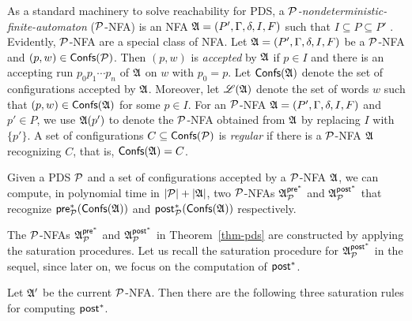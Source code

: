 
As a standard machinery to solve reachability for PDS, a \emph{${\mathcal{P} }$-nondeterministic-finite-automaton} (${\mathcal{P} }$-NFA) is an NFA ${\mathfrak{A} }=(P', \Gamma, \delta, I, F)$ such that $I \subseteq P \subseteq P'$ \cite{BEM97}.
Evidently, ${\mathcal{P} }$-NFA are a special class of NFA. 
Let ${\mathfrak{A} } = (P', \Gamma, \delta, I, F)$ be a  ${\mathcal{P} }$-NFA and  $(p, w) \in {\mathsf{Confs} }({\mathcal{P} })$. Then $(p, w)$ is \emph{accepted} by ${\mathfrak{A} }$ if $p \in I$ and there is an accepting run $p_0 p_1 \cdots p_n$ of ${\mathfrak{A} }$ on $w$ with $p_0 = p$. Let ${\mathsf{Confs} }({\mathfrak{A} })$ denote the set of configurations accepted by ${\mathfrak{A} }$. Moreover, let ${\mathscr{L} }({\mathfrak{A} })$ denote the set of words $w$ such that $(p, w) \in {\mathsf{Confs} }({\mathfrak{A} })$ for some $p \in I$. 
For an ${\mathcal{P} }$-NFA ${\mathfrak{A} } = (P', \Gamma, \delta, I, F)$ and $p' \in P$, we use ${\mathfrak{A} }(p')$ to denote the ${\mathcal{P} }$-NFA obtained from ${\mathfrak{A} }$ by replacing $I$ with $\{p'\}$. A set of configurations $C \subseteq {\mathsf{Confs} }({\mathcal{P} })$ is \emph{regular} if there is a ${\mathcal{P} }$-NFA ${\mathfrak{A} }$ recognizing $C$, that is, ${\mathsf{Confs} }({\mathfrak{A} }) = C$. %

\begin{theorem}\label{thm-pds}
	Given  a PDS ${\mathcal{P} }$ and a set of configurations accepted by a ${\mathcal{P} }$-NFA ${\mathfrak{A} }$, we can compute, in polynomial time in $|{\mathcal{P} }|+|{\mathfrak{A} }|$, two ${\mathcal{P} }$-NFAs ${\mathfrak{A} }^{{\mathsf{pre} }^*}_{{\mathcal{P} }}$  and ${\mathfrak{A} }^{{\mathsf{post} }^*}_{{\mathcal{P} }}$ that recognize ${\mathsf{pre} }^*_{\mathcal{P} }({\mathsf{Confs} }({\mathfrak{A} }))$ and ${\mathsf{post} }^*_{\mathcal{P} }({\mathsf{Confs} }({\mathfrak{A} }))$ respectively.
\end{theorem}

The ${\mathcal{P} }$-NFAs ${\mathfrak{A} }^{{\mathsf{pre} }^*}_{{\mathcal{P} }}$ and ${\mathfrak{A} }^{{\mathsf{post} }^*}_{{\mathcal{P} }}$ in Theorem~\ref{thm-pds} are constructed by applying the saturation procedures. Let us recall the saturation procedure for ${\mathfrak{A} }^{{\mathsf{post} }^*}_{{\mathcal{P} }}$ in the sequel, since later on, we focus on the computation of ${\mathsf{post} }^*$.

Let ${\mathfrak{A} }'$ be the current ${\mathcal{P} }$-NFA. Then there are the following three saturation rules for computing ${\mathsf{post} }^*$. 


